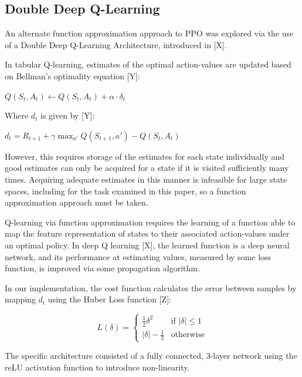 \documentclass{article}
\begin{document}
	
	\subsection{Double Deep Q-Learning}
	
	An alternate function approximation approach to PPO was explored via the use of a Double Deep Q-Learning Architecture, introduced in [X].
	
	In tabular Q-learning, estimates of the optimal action-values are updated based on Bellman's optimality equation [Y]:
	\\
	\begin{center}
		$Q(S_{t}, A_{t}) \leftarrow Q(S_{t}, A_{t}) + \alpha\cdot\delta_{t}$
	\end{center}
	
	Where $d_{t}$ is given by [Y]:
	
	\begin{center}
		$d_{t} = R_{t+1} + \gamma\max_{a'}Q(S_{t+1}, a') - Q(S_{t}, A_{t})$
	\end{center}
	
	However, this requires storage of the estimates for each state individually and good estimates can only be acquired for a state if it is visited sufficiently many times. Acquiring adequate estimates in this manner is infeasible for large state spaces, including for the task examined in this paper, so a function approximation approach must be taken.
	
	Q-learning via function approximation requires the learning of a function able to map the feature representation of states to their associated action-values under an optimal policy. In deep Q learning [X], the learned function is a deep neural network, and its performance at estimating values, measured by some loss function, is improved via some propagation algorithm.
	
	In our implementation, the cost function calculates the error between samples by mapping $d_{t}$ using the Huber Loss function [Z]:
	
	\begin{equation}
		L(\delta)=
		\begin{cases}
			\frac{1}{2}\delta^{2} & \text{if  } |\delta| \leq 1\\
			|\delta| - \frac{1}{2} & \text{otherwise} 
		\end{cases}
	\end{equation}
	
	The specific architecture consisted of a fully connected, 3-layer network using the reLU activation function to introduce non-linearity.
	
\end{document}
